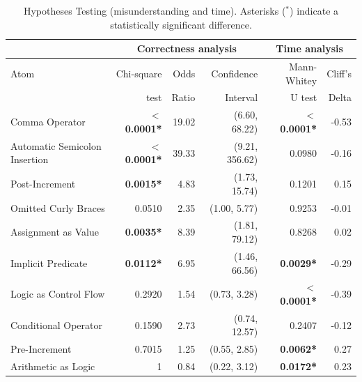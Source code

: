  \begin{table}[ht]
\caption{Hypotheses Testing (misunderstanding and time). Asterisks ($^{*}$) indicate a statistically significant difference.}
 \centering
 {\scriptsize
 \begin{tabular}{lrrr|rr}
   \toprule
      & \multicolumn{3}{c}{Correctness analysis} & \multicolumn{2}{c}{Time analysis} \\ \toprule
Atom  & Chi-square & Odds           & Confidence & Mann-Whitey& Cliff's\\ 
 &  test &Ratio          & Interval &  U test & Delta \\  \midrule
Comma Operator & \textbf{$<$ 0.0001*} & 19.02 & (6.60, 68.22) & \textbf{$<$ 0.0001*} & -0.53 \\ 
Automatic Semicolon Insertion & \textbf{$<$ 0.0001*} & 39.33 & (9.21, 356.62) & 0.0980 & -0.16 \\ 
Post-Increment & \textbf{0.0015*} & 4.83 & (1.73, 15.74) & 0.1201 & 0.15 \\ 
Omitted Curly Braces & 0.0510 & 2.35 & (1.00, 5.77) & 0.9253 & -0.01 \\ 
Assignment as Value & \textbf{0.0035*} & 8.39 & (1.81, 79.12) & 0.8268 & 0.02 \\ 
Implicit Predicate & \textbf{0.0112*} & 6.95 & (1.46, 66.56) & \textbf{0.0029*} & -0.29 \\ 
Logic as Control Flow & 0.2920 & 1.54 & (0.73, 3.28) & \textbf{$<$ 0.0001*} & -0.39 \\ 
Conditional Operator & 0.1590 & 2.73 & (0.74, 12.57) & 0.2407 & -0.12 \\ 
Pre-Increment & 0.7015 & 1.25 & (0.55, 2.85) & \textbf{0.0062*} & 0.27 \\ 
Arithmetic as Logic & 1 & 0.84 & (0.22, 3.12) & \textbf{0.0172*} & 0.23 \\ 
    \bottomrule
 \end{tabular}}
 \label{tab:hypothesis-testing}
 \end{table}


